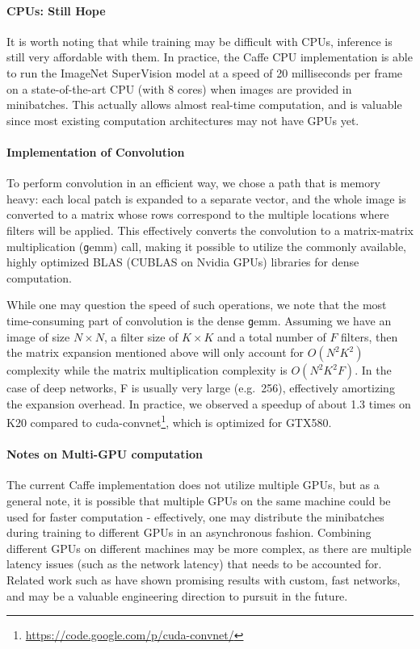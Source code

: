\paragraph{CPUs: Still Hope} It is worth noting that while training may be difficult with CPUs, inference is still very affordable with them. In practice, the Caffe CPU implementation is able to run the ImageNet SuperVision model at a speed of 20 milliseconds per frame on a state-of-the-art CPU (with 8 cores) when images are provided in minibatches. This actually allows almost real-time computation, and is valuable since most existing computation architectures may not have GPUs yet.

\paragraph{Implementation of Convolution} To perform convolution in an efficient way, we chose a path that is memory heavy: each local patch is expanded to a separate vector, and the whole image is converted to a matrix whose rows correspond to the multiple locations where filters will be applied. This effectively converts the convolution to a matrix-matrix multiplication ({\texttt gemm}) call, making it possible to utilize the commonly available, highly optimized BLAS (CUBLAS on Nvidia GPUs) libraries for dense computation.

While one may question the speed of such operations, we note that the most time-consuming part of convolution is the dense {\texttt gemm}. Assuming we have an image of size $N\times N$, a filter size of $K\times K$ and a total number of 
$F$ filters, then the matrix expansion mentioned above will only account for $O(N^2K^2)$ complexity while the matrix multiplication complexity is $O(N^2K^2F)$. In the case of deep networks, F is usually very large (e.g.\ 256), effectively amortizing the expansion overhead. In practice, we observed a speedup of about 1.3 times on K20 compared to cuda-convnet\footnote{\url{https://code.google.com/p/cuda-convnet/}}, which is optimized for GTX580.

\paragraph{Notes on Multi-GPU computation} The current Caffe implementation does not utilize multiple GPUs, but as a general note, it is possible that multiple GPUs on the same machine could be used for faster computation - effectively, one may distribute the minibatches during training to different GPUs in an asynchronous fashion. Combining different GPUs on different machines may be more complex, as there are multiple latency issues (such as the network latency) that needs to be accounted for. Related work such as \cite{coates2013deep} have shown promising results with custom, fast networks, and may be a valuable engineering direction to pursuit in the future.

